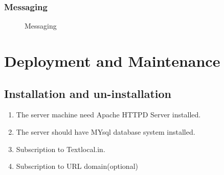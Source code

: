 \documentclass[oneside,a4paper,12pt]{book}
\begin{document}
\subsection{Messaging}
 \begin{center}
	\begin{figure}[!htbp]
		\centering
		
		
		
	  \caption{Messaging}
	  \label{fig:Messaging}
	\end{figure}
\end{center}
    
\chapter{Deployment and Maintenance}
     \section{Installation and un-installation}
     \begin{enumerate}
     \item The server machine need Apache HTTPD Server installed.
     \item The server should have MYsql database system installed.
     \item Subscription to Textlocal.in.
     \item Subscription to URL domain(optional)
     
     
     
     \end{enumerate}
     
    
     
\end{document}
